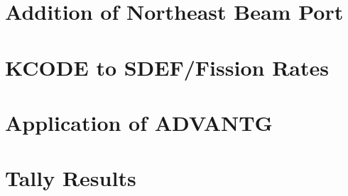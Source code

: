 \section{Addition of Northeast Beam Port}
\section{KCODE to SDEF/Fission Rates}
\section{Application of ADVANTG}
\section{Tally Results}
